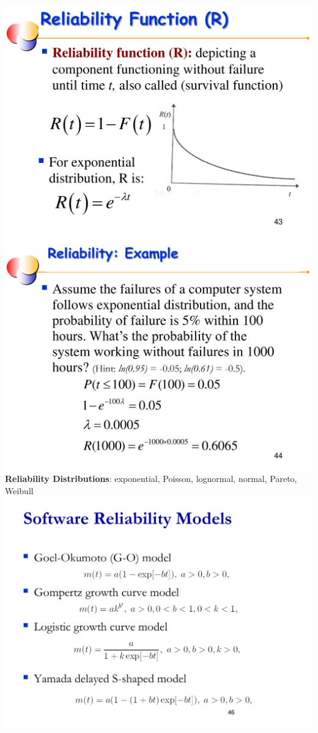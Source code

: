\documentclass[a4paper]{article}
\begin{document}
\begin{multicols}{3}
        \includegraphics[width=\linewidth]{387.pdf}\\
        \includegraphics[width=\linewidth]{388.pdf}\\
        \textbf{Reliability Distributions}: exponential, Poisson, lognormal, normal, Pareto, Weibull\\
        \includegraphics[width=\linewidth]{390.pdf}\\

\end{multicols}
\end{document}
